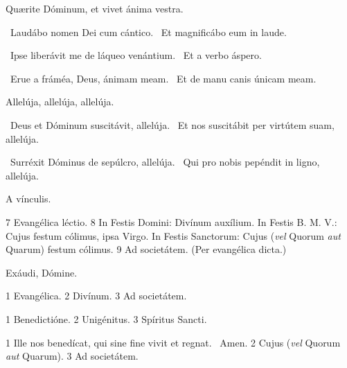  Quærite Dóminum, et vivet ánima vestra.


\V\ Laudábo nomen Dei cum cántico. \R\ Et magnificábo eum in laude.


\V\ Ipse liberávit me de láqueo venántium. \R\ Et a verbo áspero.


\V\ Erue a fráméa, Deus, ánimam meam. \R\ Et de manu canis únicam meam.


 Allelúja, allelúja, allelúja.


\V\ Deus et Dóminum suscitávit, allelúja. \R\ Et nos suscitábit per virtútem suam, allelúja.


\V\ Surréxit Dóminus de sepúlcro, allelúja. \R\ Qui pro nobis pepéndit in ligno, allelúja.


 A vínculis.

 7 Evangélica léctio. 8 In Festis Domini: Divínum auxílium. In Festis B. M. V.: Cujus festum cólimus, ipsa Virgo. In Festis Sanctorum: Cujus (\textit{vel} Quorum \textit{aut} Quarum) festum cólimus. 9 Ad societátem. (Per evangélica dicta.)


 Exáudi, Dómine.


 1 Evangélica. 2 Divínum. 3 Ad societátem.


 1 Benedictióne. 2 Unigénitus. 3 Spíritus Sancti.


 1 Ille nos benedícat, qui sine fine vivit et regnat. \R\ Amen. 2 Cujus (\textit{vel} Quorum \textit{aut} Quarum). 3 Ad societátem.

\sectionornament

